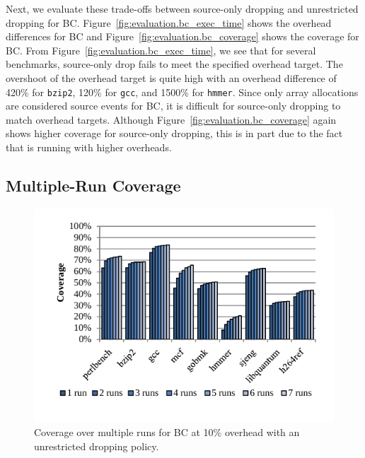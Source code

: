 Next, we evaluate these trade-offs between source-only dropping and unrestricted dropping for BC.
Figure~\ref{fig:evaluation.bc_exec_time} shows the overhead differences for BC
and Figure~\ref{fig:evaluation.bc_coverage} shows the coverage for BC.
From Figure~\ref{fig:evaluation.bc_exec_time}, we see that for several
benchmarks, source-only drop fails to meet the specified overhead target.
The overshoot of the overhead target is quite high with an overhead difference
of 420\% for {\tt bzip2}, 120\% for {\tt gcc}, and 1500\% for {\tt hmmer}.
Since only array allocations are considered source events for BC, it is
difficult for source-only dropping to match overhead targets. Although
Figure~\ref{fig:evaluation.bc_coverage} again shows higher coverage for
source-only dropping, this is in part due to the fact that is running with
higher overheads.

\subsection{Multiple-Run Coverage}

\begin{figure}
  \begin{center}
    \includegraphics[width=\columnwidth]{figs/data_multirun_coverage.pdf}
    \vspace{-0.2in}
    \caption{Coverage over multiple runs for BC at 10\% overhead with an unrestricted dropping policy.}
    \label{fig:evaluation.multirun}
    \vspace{-0.1in}
  \end{center}
\end{figure}


